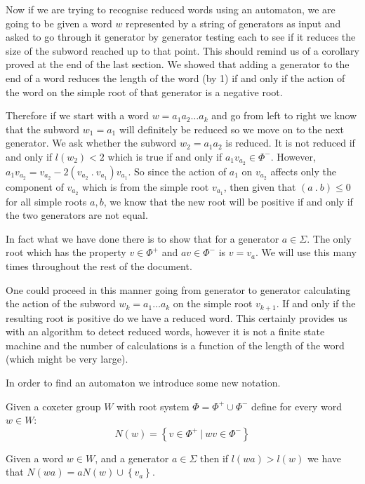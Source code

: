 \documentclass[a4paper,12pt]{article}
\begin{document}
Now if we are trying to recognise reduced words using an automaton, we are going to be given a word $w$ represented by a string of generators as input and asked to go through it generator by generator testing each to see if it reduces the size of the subword reached up to that point. This should remind us of a corollary proved at the end of the last section. We showed that adding a generator to the end of a word reduces the length of the word (by 1) if and only if the action of the word on the simple root of that generator is a negative root.

Therefore if we start with a word $w = a_1a_2 \ldots a_k$ and go from left to right we know that the subword $w_1 = a_1$ will definitely be reduced so we move on to the next generator. We ask whether the subword $w_2 = a_1a_2$ is reduced. It is not reduced if and only if $l(w_2) < 2$ which is true if and only if $a_1v_{a_2} \in \Phi^-$. However, $a_1v_{a_2} = v_{a_2} - 2(v_{a_2} \: . \: v_{a_1})v_{a_1}$. So since the action of $a_1$ on $v_{a_2}$ affects only the component of $v_{a_2}$ which is from the simple root $v_{a_1}$, then given that $(a \: . \: b) \leq 0$ for all simple roots $a, b$, we know that the new root will be positive if and only if the two generators are not equal.

In fact what we have done there is to show that for a generator $a \in \Sigma$. The only root which has the property $v \in \Phi^+$ and $av \in \Phi^-$ is $v = v_a$. We will use this many times throughout the rest of the document.

One could proceed in this manner going from generator to generator calculating the action of the subword $w_k = a_1 \ldots a_k$ on the simple root $v_{k + 1}$. If and only if the resulting root is positive do we have a reduced word. This certainly provides us with an algorithm to detect reduced words, however it is not a finite state machine and the number of calculations is a function of the length of the word (which might be very large). 

In order to find an automaton we introduce some new notation.

\begin{definition}
	Given a coxeter group $W$ with root system $\Phi = \Phi^+ \cup \Phi^-$ define for every word $w \in W$:
	\[N(w) = \left\{v \in \Phi^+ \: | \: wv \in \Phi^-\right\}\]
\end{definition}

\begin{lem}
	Given a word $w \in W$, and a generator $a \in \Sigma$ then if $l(wa) > l(w)$ we have that $N(wa) = aN(w) \cup \left\{v_a\right\}$.
\end{lem}
\end{document}
